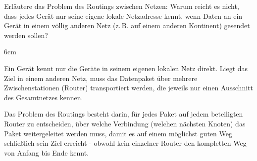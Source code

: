 \question[3]
Erläutere das Problem des Routings zwischen Netzen:
Warum reicht es nicht, dass jedes Gerät nur seine eigene lokale Netzadresse kennt,
wenn Daten an ein Gerät in einem völlig anderen Netz (z.\,B. auf einem anderen Kontinent)
gesendet werden sollen?

\begin{solutionbox}{6cm}

Ein Gerät kennt nur die Geräte in seinem eigenen lokalen Netz
direkt. Liegt das Ziel in einem anderen Netz, muss das
Datenpaket über mehrere Zwischenstationen (Router) transportiert
werden, die jeweils nur einen Ausschnitt des Gesamtnetzes
kennen.

Das Problem des Routings besteht darin, für jedes Paket auf
jedem beteiligten Router zu entscheiden, über welche
Verbindung (welchen nächsten Knoten) das Paket weitergeleitet
werden muss, damit es auf einem möglichst guten Weg
schließlich sein Ziel erreicht - obwohl kein einzelner Router
den kompletten Weg von Anfang bis Ende kennt.

\end{solutionbox}